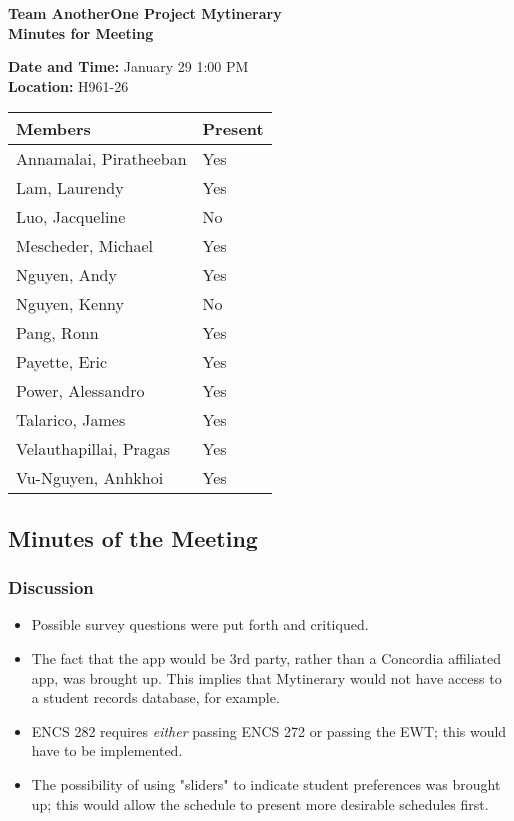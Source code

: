 \documentclass[paper=a4, fontsize=11pt]{scrartcl}
\begin{document}
\thispagestyle{empty}

\begin{center}
\textbf{Team AnotherOne \qquad Project Mytinerary \\ Minutes for Meeting}
\vspace{0.33cm}
\end{center}

\textbf{Date and Time:} January 29 1:00 PM \\
\textbf{Location:} H961-26 \\

\begin{center}
\begin{tabular}{| m{4cm} | m{4cm} |} \hline
\textbf{Members} & \textbf{Present} \\ \hline
Annamalai, Piratheeban & Yes \\ \hline
Lam, Laurendy          & Yes \\ \hline
Luo, Jacqueline        & No  \\ \hline
Mescheder, Michael     & Yes \\ \hline
Nguyen, Andy           & Yes \\ \hline
Nguyen, Kenny          & No  \\ \hline
Pang, Ronn             & Yes \\ \hline
Payette, Eric          & Yes \\ \hline
Power, Alessandro      & Yes \\ \hline
Talarico, James        & Yes \\ \hline
Velauthapillai, Pragas & Yes \\ \hline
Vu-Nguyen, Anhkhoi     & Yes \\ \hline
\end{tabular}
\end{center}

\subsection*{Minutes of the Meeting}
\subsubsection*{Discussion}
\begin{itemize}
    \item Possible survey questions were put forth and critiqued.
    \item The fact that the app would be 3rd party, rather than a Concordia
    affiliated app, was brought up. This implies that Mytinerary would not have
    access to a student records database, for example.
    \item ENCS 282 requires \emph{either} passing ENCS 272 or passing the EWT; this
    would have to be implemented.
    \item The possibility of using "sliders" to indicate student preferences was
    brought up; this would allow the schedule to present more desirable schedules first.
\end{itemize}
\end{document}
